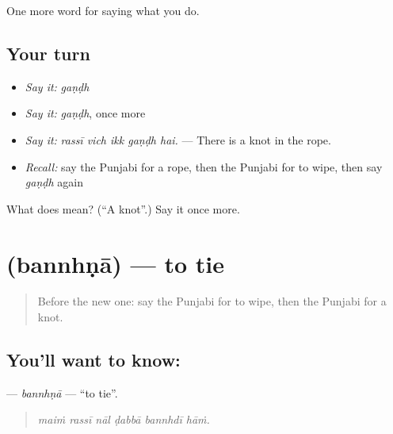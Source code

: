 \begin{grammarlens}[title={What you've built}]
One more word for saying what you do.
\end{grammarlens}

\subsection*{Your turn}
\begin{itemize}
\raggedright
  \item \emph{Say it:} \emph{gaṇḍh}
  \item \emph{Say it:} \emph{gaṇḍh}, once more
  \item \emph{Say it:} \emph{rassī vich ikk gaṇḍh hai.} — There is a knot in the rope.
  \item \emph{Recall:} say the Punjabi for a rope, then the Punjabi for to wipe, then say \emph{gaṇḍh} again
\end{itemize}

\begin{tcolorbox}[breakable,colback=teal!4,colframe=teal!35!black,title={Before you move on}]
What does  mean? (\textquotedblleft{}A knot\textquotedblright{}.) Say it once more.
\end{tcolorbox}
\section[\texorpdfstring{\pa{ਬੰਨ੍ਹਣਾ} (bannhṇā)}{ਬੰਨ੍ਹਣਾ (bannhṇā)}]{ (bannhṇā) — to tie}

\label{lesson:PA-C229-bannhna}



\begin{quote}
Before the new one: say the Punjabi for to wipe, then the Punjabi for a knot.
\end{quote}

\subsection*{You'll want to know: }
\textbf{} — \emph{bannhṇā} — \textquotedblleft{}to tie\textquotedblright{}.

\begin{quote}
     
\end{quote}

\begin{quote}
\emph{maiṁ rassī nāl ḍabbā bannhdī hāṁ.}
\end{quote}

